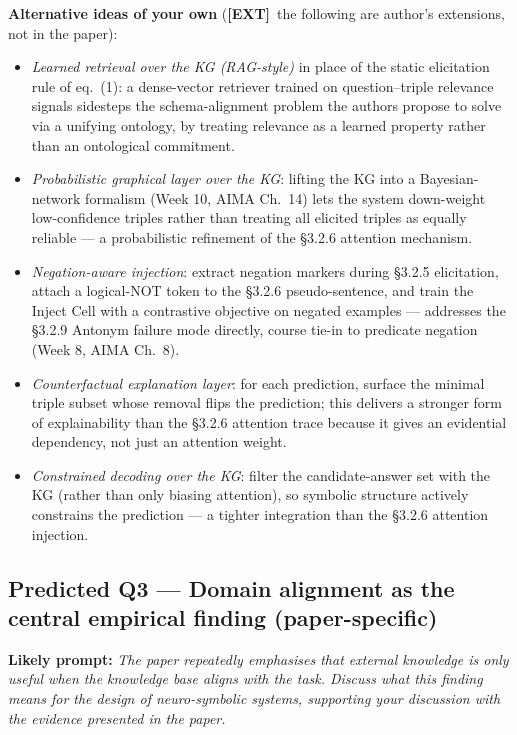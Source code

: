 \documentclass[11pt, a4paper]{article}
\newcommand{\extflag}{\textcolor{trapBd}{\textbf{[EXT]}}\,}
\begin{document}
\textbf{Alternative ideas of your own} (\extflag{} the following are author's extensions, not in the paper):
\begin{itemize}
  \item \emph{Learned retrieval over the KG (RAG-style)} in place of the static elicitation rule of eq.\ (1): a dense-vector retriever trained on question--triple relevance signals sidesteps the schema-alignment problem the authors propose to solve via a unifying ontology, by treating relevance as a learned property rather than an ontological commitment.
  \item \emph{Probabilistic graphical layer over the KG}: lifting the KG into a Bayesian-network formalism (Week 10, AIMA Ch.\ 14) lets the system down-weight low-confidence triples rather than treating all elicited triples as equally reliable — a probabilistic refinement of the §3.2.6 attention mechanism.
  \item \emph{Negation-aware injection}: extract negation markers during §3.2.5 elicitation, attach a logical-NOT token to the §3.2.6 pseudo-sentence, and train the Inject Cell with a contrastive objective on negated examples — addresses the §3.2.9 Antonym failure mode directly, course tie-in to predicate negation (Week 8, AIMA Ch.\ 8).
  \item \emph{Counterfactual explanation layer}: for each prediction, surface the minimal triple subset whose removal flips the prediction; this delivers a stronger form of explainability than the §3.2.6 attention trace because it gives an evidential dependency, not just an attention weight.
  \item \emph{Constrained decoding over the KG}: filter the candidate-answer set with the KG (rather than only biasing attention), so symbolic structure actively constrains the prediction — a tighter integration than the §3.2.6 attention injection.
\end{itemize}

\subsection{Predicted Q3 — Domain alignment as the central empirical finding (paper-specific)}

\textbf{Likely prompt:} \emph{The paper repeatedly emphasises that external knowledge is only useful when the knowledge base aligns with the task. Discuss what this finding means for the design of neuro-symbolic systems, supporting your discussion with the evidence presented in the paper.}
\end{document}
